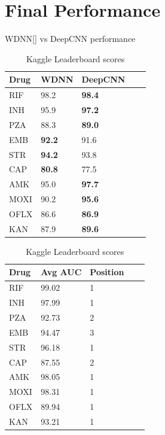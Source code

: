 \documentclass{article}
\begin{document}
\section{Final Performance}
\label{section:final}
\begin{table}[t]
  \begin{minipage}{0.5\linewidth}
  \centering
  \caption{WDNN[] vs DeepCNN performance}
  \begin{tabular}{lllll}
      \toprule
      \multirow{1}{*}[0em]{Drug} & WDNN & DeepCNN\\
      \midrule
      RIF & 98.2 & \textbf{98.4}\\
      INH & 95.9 & \textbf{97.2} \\
      PZA & 88.3 & \textbf{89.0} \\
      EMB & \textbf{92.2} & 91.6 \\
      STR & \textbf{94.2} & 93.8\\
      CAP & \textbf{80.8} & 77.5 \\
      AMK & 95.0 & \textbf{97.7} \\
      MOXI & 90.2 & \textbf{95.6} \\
      OFLX & 86.6 & \textbf{86.9}\\
      KAN & 87.9 & \textbf{89.6} \\
      \bottomrule
  \end{tabular}
  \label{table:compare_sota}
\end{minipage}
\begin{minipage}{0.5\linewidth}
  \centering
  \caption{Kaggle Leaderboard scores}
  \begin{tabular}{lllll}
      \toprule
      \multirow{1}{*}[0em]{Drug} & Avg AUC & Position\\
      \midrule
      RIF & 99.02 & 1\\
      INH & 97.99 & 1\\
      PZA & 92.73 & 2\\
      EMB & 94.47 & 3\\
      STR & 96.18 & 1\\
      CAP & 87.55 & 2\\
      AMK & 98.05 & 1\\
      MOXI & 98.31 & 1\\
      OFLX & 89.94 & 1\\
      KAN & 93.21 & 1\\
      \bottomrule
  \end{tabular}
  \label{table:kaggle_results}
\end{minipage}
\end{table}
\end{document}
